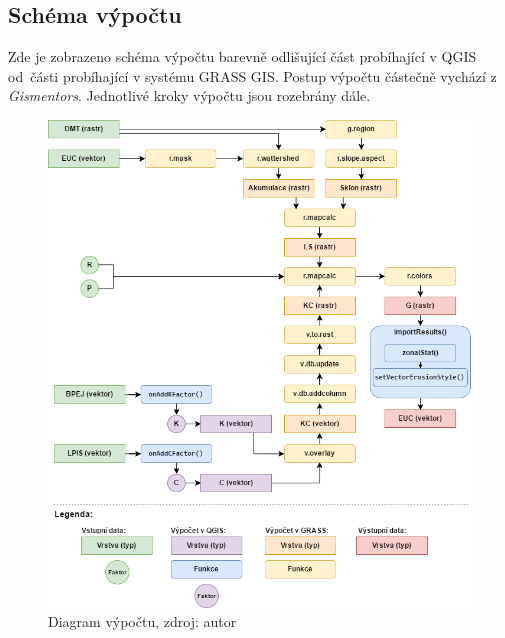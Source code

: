\subsection{Schéma výpočtu} Zde je zobrazeno schéma výpočtu barevně
odlišující část probíhající v QGIS od~části probíhající v systému
GRASS GIS. Postup výpočtu částečně vychází z
\textit{Gismentors}\cite{gismentors}. Jednotlivé kroky výpočtu jsou
rozebrány dále.
\begin{figure}[H]
\centering \includegraphics[scale=0.6]{./pictures/diagram.png}
      \caption[Diagram výpočtu] {Diagram výpočtu, zdroj: autor}
      \label{diagram}
\end{figure}
\newpage
